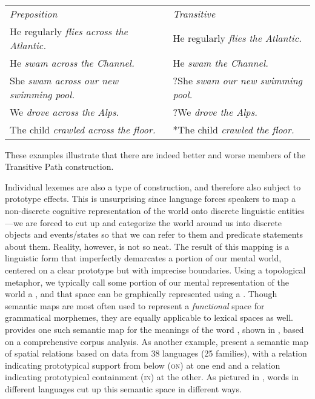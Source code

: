 \begin{exe}
  \ex\label{ex:2.21}
  \hspace{0.5em}\\
  \begin{tabular}[t]{ l l }
    \textit{Preposition}                         & \textit{Transitive}\\
    He regularly \em{flies across} the Atlantic. & He regularly \em{flies} the Atlantic.\\
    He \em{swam across} the Channel.             & He \em{swam} the Channel.\\
    She \em{swam across} our new swimming pool.  & ?She \em{swam} our new swimming pool.\\
    We \em{drove across} the Alps.               & ?We \em{drove} the Alps.\\
    The child \em{crawled across} the floor.     & *The child \em{crawled} the floor.\\
  \end{tabular}
  \vspace{0.5em}
\end{exe}

\noindent These examples illustrate that there are indeed better and worse members of the  Transitive Path construction.

Individual lexemes are also a type of construction, and therefore also subject to prototype effects. This is unsurprising since language forces speakers to map a non-discrete cognitive representation of the world onto discrete linguistic entities—we are forced to cut up and categorize the world around us into discrete objects and events/states so that we can refer to them and predicate statements about them. Reality, however, is not so neat. The result of this mapping is a linguistic form that imperfectly demarcates a portion of our mental world, centered on a clear prototype but with imprecise boundaries. Using a topological metaphor, we typically call some portion of our mental representation of the world a  \parencites[140]{Finch2003}, and that space can be graphically represented using a  \parencites[§2.4.3]{Croft2001b}{Haspelmath2003}. Though semantic maps are most often used to represent a \emph{functional} space for grammatical morphemes, they are equally applicable to lexical spaces as well. \textcite[74]{Gries2006} provides one such semantic map for the meanings of the  word , shown in , based on a comprehensive corpus analysis. As another example, \textcite[485]{BowermanChoi2001} present a semantic map of spatial relations based on data from 38 languages (25 families), with a relation indicating prototypical support from below (\textsc{on}) at one end and a relation indicating prototypical containment (\textsc{in}) at the other. As pictured in , words in different languages cut up this semantic space in different ways.

